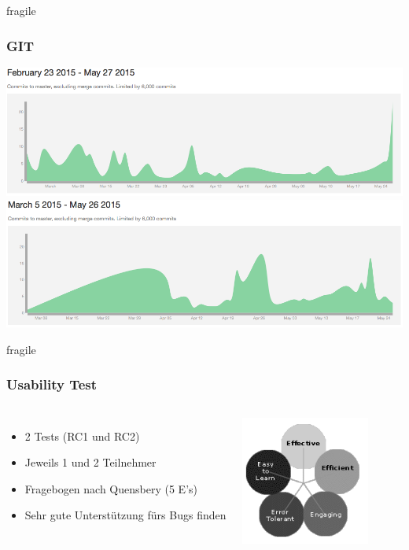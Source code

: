 \documentclass[10pt, compress]{beamer}
\begin{document}
\begin{frame}{fragile}
   \frametitle{GIT}
   \includegraphics[scale=0.3]{doku}\newline
\includegraphics[scale=0.3]{code}
\end{frame}


\begin{frame}{fragile}
  \frametitle{Usability Test}
  \begin{columns}[onlytextwidth]
  \begin{itemize}
    \item 2 Tests (RC1 und RC2)
    \item Jeweils 1 und 2 Teilnehmer
    \item Fragebogen nach Quensbery (5 E's)
    \item Sehr gute Unterstützung fürs Bugs finden
  \end{itemize}
  
  \begin{center}
    \includegraphics[width=0.8\textwidth]{quesenbery}
  \end{center}
   
  \end{columns}
\end{frame}
\end{document}
